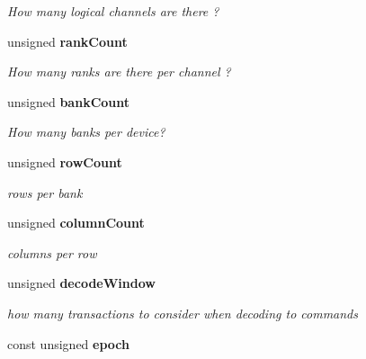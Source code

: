 \begin{CompactItemize}
\begin{CompactList}\small\item\em How many logical channels are there ? \item\end{CompactList}\item 
unsigned {\bf rankCount}\label{class_d_r_a_msim_i_i_1_1_system_configuration_c4ac59a449547cd27fa8ed069378e7b8}

\begin{CompactList}\small\item\em How many ranks are there per channel ? \item\end{CompactList}\item 
unsigned {\bf bankCount}\label{class_d_r_a_msim_i_i_1_1_system_configuration_2f553342c595248f67602f541bae62f9}

\begin{CompactList}\small\item\em How many banks per device? \item\end{CompactList}\item 
unsigned {\bf rowCount}\label{class_d_r_a_msim_i_i_1_1_system_configuration_6b49c8001b6f9c65aeebcfca03404bd0}

\begin{CompactList}\small\item\em rows per bank \item\end{CompactList}\item 
unsigned {\bf columnCount}\label{class_d_r_a_msim_i_i_1_1_system_configuration_40ffc8cdfcd378bf864d648113f6b4b3}

\begin{CompactList}\small\item\em columns per row \item\end{CompactList}\item 
unsigned {\bf decodeWindow}\label{class_d_r_a_msim_i_i_1_1_system_configuration_c870e61295fc38f0527aca83418602e2}

\begin{CompactList}\small\item\em how many transactions to consider when decoding to commands \item\end{CompactList}\item 
const unsigned {\bf epoch}\label{class_d_r_a_msim_i_i_1_1_system_configuration_5016c31730e2cd299c3673bc3dac8f22}


\end{CompactItemize}
